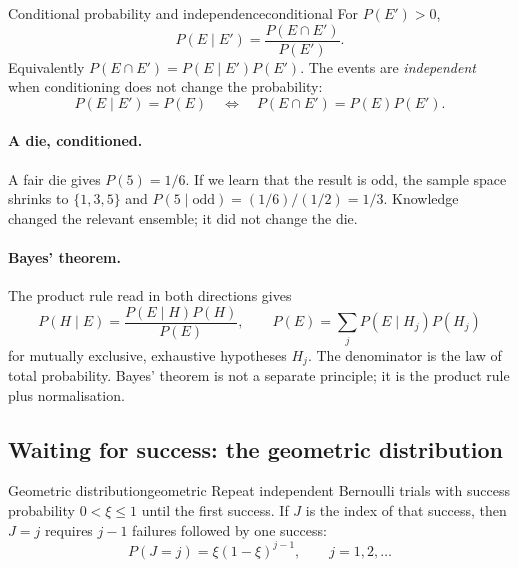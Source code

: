 \begin{definition}{Conditional probability and independence}{conditional}
For $P(E')>0$,
\begin{equation}\label{eq:lec02:conditional}
P(E\mid E')=\frac{P(E\cap E')}{P(E')}.
\end{equation}
Equivalently $P(E\cap E')=P(E\mid E')P(E')$. The events are \emph{independent} when conditioning does not change the probability:
\begin{equation}\label{eq:lec02:independent}
P(E\mid E')=P(E)\quad\Longleftrightarrow\quad P(E\cap E')=P(E)P(E').
\end{equation}
\end{definition}

\paragraph{A die, conditioned.} A fair die gives $P(5)=1/6$. If we learn that the result is odd, the sample space shrinks to $\{1,3,5\}$ and $P(5\mid\text{odd})=(1/6)/(1/2)=1/3$. Knowledge changed the relevant ensemble; it did not change the die.

\paragraph{Bayes' theorem.} The product rule read in both directions gives
\begin{equation}\label{eq:lec02:bayes}
P(H\mid E)=\frac{P(E\mid H)P(H)}{P(E)},
\qquad
P(E)=\sum_jP(E\mid H_j)P(H_j)
\end{equation}
for mutually exclusive, exhaustive hypotheses $H_j$. The denominator is the law of total probability. Bayes' theorem is not a separate principle; it is the product rule plus normalisation.

\subsection{Waiting for success: the geometric distribution}\label{subsec:lec02:geometric}
\begin{definition}{Geometric distribution}{geometric}
Repeat independent Bernoulli trials with success probability $0<\xi\leq1$ until the first success. If $J$ is the index of that success, then $J=j$ requires $j-1$ failures followed by one success:
\begin{equation}\label{eq:lec02:geometric}
P(J=j)=\xi(1-\xi)^{j-1},\qquad j=1,2,\dots
\end{equation}
\end{definition}

